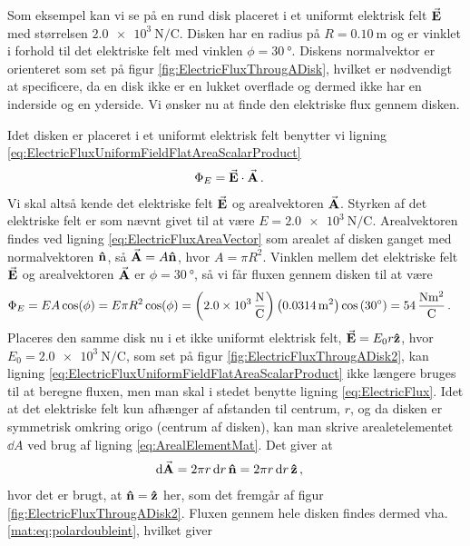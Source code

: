 Som eksempel kan vi se på en rund disk placeret i et uniformt elektrisk felt $\va{E}$ med størrelsen $\SI{2.0e3}{\newton/\coulomb}$. Disken har en radius på $R = \SI{0.10}{\meter}$ og er vinklet i forhold til det elektriske felt med vinklen $\phi = \SI{30}{\degree}$. Diskens normalvektor er orienteret som set på figur \ref{fig:ElectricFluxThrougADisk}, hvilket er nødvendigt at specificere, da en disk ikke er en lukket overflade og dermed ikke har en inderside og en yderside. Vi ønsker nu at finde den elektriske flux gennem disken.

Idet disken er placeret i et uniformt elektrisk felt benytter vi ligning \eqref{eq:ElectricFluxUniformFieldFlatAreaScalarProduct}
\begin{align}
    \Phi_E &= \va{E} \cdot \va{A} \, .
\end{align}
Vi skal altså kende det elektriske felt $\va{E}$ og arealvektoren $\va{A}$. Styrken af det elektriske felt er som nævnt givet til at være $E = \SI{2.0e3}{\newton/\coulomb}$. Arealvektoren findes ved ligning \eqref{eq:ElectricFluxAreaVector} som arealet af disken ganget med normalvektoren $\vu{n}$, så $\va{A} = A\vu{n}$, hvor $A = \pi R^2$. Vinklen mellem det elektriske felt $\va{E}$ og arealvektoren $\va{A}$ er $\phi = \SI{30}{\degree}$, så vi får fluxen gennem disken til at være
\begin{align}
    \Phi_E &= EA\cos(\phi)
        = E \pi R^2 \cos(\phi)
        = \left(\SI{2.0e3}{\frac{\newton}{\coulomb}}\right) \left(\SI{0.0314}{\meter^2}\right) \cos\left(\SI{30}{\degree}\right)
        = \SI{54}{\frac{\newton\meter^2}{\coulomb}} \, .
\end{align}
Placeres den samme disk nu i et ikke uniformt elektrisk felt, $\va{E} = E_0 r \vu{z}$, hvor $E_0 = \SI{2.0e3}{\newton/\coulomb}$, som set på figur \ref{fig:ElectricFluxThrougADisk2}, kan ligning \eqref{eq:ElectricFluxUniformFieldFlatAreaScalarProduct} ikke længere bruges til at beregne fluxen, men man skal i stedet benytte ligning \eqref{eq:ElectricFlux}. Idet at det elektriske felt kun afhænger af afstanden til centrum, $r$, og da disken er symmetrisk omkring origo (centrum af disken), kan man skrive arealetelementet $\dd{A}$ ved brug af ligning \eqref{eq:ArealElementMat}. Det giver at
\begin{align}
    \dd{\va{A}} &= 2\pi r \dd{r} \vu{n} = 2\pi r \dd{r} \vu z \, ,
\end{align}
hvor det er brugt, at $\vu{n} = \vu z$ her, som det fremgår af figur \ref{fig:ElectricFluxThrougADisk2}. Fluxen gennem hele disken findes dermed vha. \eqref{mat:eq:polardoubleint}, hvilket giver
